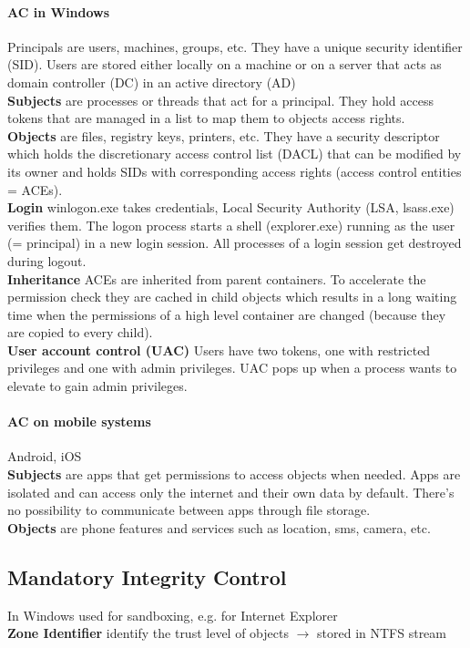 \documentclass[12pt]{article}
\begin{document}
	\paragraph{AC in Windows} Principals are users, machines, groups, etc. They have a unique security identifier (SID). Users are stored either locally on a machine or on a server that acts as domain controller (DC) in an active directory (AD)\\
	\textbf{Subjects} are processes or threads that act for a principal. They hold access tokens that are managed in a list to map them to objects access rights.\\
	\textbf{Objects} are files, registry keys, printers, etc. They have a security descriptor which holds the discretionary access control list (DACL) that can be modified by its owner and holds SIDs with corresponding access rights (access control entities = ACEs).\\
	\textbf{Login} winlogon.exe takes credentials, Local Security Authority (LSA, lsass.exe) verifies them. The logon process starts a shell (explorer.exe) running as the user (= principal) in a new login session. All processes of a login session get destroyed during logout.\\
	\textbf{Inheritance} ACEs are inherited from parent containers. To accelerate the permission check they are cached in child objects which results in a long waiting time when the permissions of a high level container are changed (because they are copied to every child).\\
	\textbf{User account control (UAC)} Users have two tokens, one with restricted privileges and one with admin privileges. UAC pops up when a process wants to elevate to gain admin privileges.
	
	\paragraph{AC on mobile systems} Android, iOS\\
	\textbf{Subjects} are apps that get permissions to access objects when needed. Apps are isolated and can access only the internet and their own data by default. There's no possibility to communicate between apps through file storage.\\
	\textbf{Objects} are phone features and services such as location, sms, camera, etc.
	
	
	\subsection{Mandatory Integrity Control}
	In Windows used for sandboxing, e.g. for Internet Explorer\\
	\textbf{Zone Identifier} identify the trust level of objects $\rightarrow$ stored in NTFS stream
	
\end{document}
